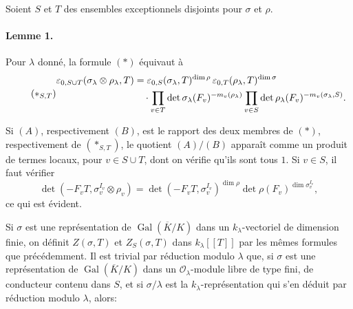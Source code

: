 \documentclass[11pt]{article}
\newcommand{\Gal}{\operatorname{Gal}}
\newcommand{\dimn}{\operatorname{dim}}
\newcommand{\eps}{\varepsilon}
\newcommand{\cO}{\mathcal O}
\begin{document}
Soient $S$ et $T$ des ensembles exceptionnels disjoints pour $\sigma$ et $\rho$.

\paragraph{Lemme 1.} Pour $\lambda$ donné, la formule $(*)$ équivaut à
\begin{equation}\tag{$*_{S,T}$}
\begin{aligned}
\eps_{0,S\cup T}(\sigma_\lambda\otimes\rho_\lambda,T)
&=\eps_{0,S}(\sigma_\lambda,T)^{\dimn\rho}\,
  \eps_{0,T}(\rho_\lambda,T)^{\dimn\sigma} \\
&\quad\cdot \prod_{v\in T}\det\sigma_\lambda(F_v)^{-m_v(\rho_\lambda)}
 \prod_{v\in S}\det\rho_\lambda(F_v)^{-m_v(\sigma_\lambda,S)} .
\end{aligned}
\end{equation}

Si $(A)$, respectivement $(B)$, est le rapport des deux membres de $(*)$, respectivement de $(*_{S,T})$, le quotient $(A)/(B)$ apparaît comme un produit de termes locaux, pour $v\in S\cup T$, dont on vérifie qu'ils sont tous $1$. Si $v\in S$, il faut vérifier
\[
 \det(-F_vT,\sigma_v^{I_v}\otimes\rho_v)
 =\det(-F_vT,\sigma_v^{I_v})^{\dimn\rho}
   \det\rho(F_v)^{\dimn\sigma_v^{I_v}},
\]
ce qui est évident.

Si $\sigma$ est une représentation de $\Gal(\overline K/K)$ dans un $k_\lambda$-vectoriel de dimension finie, on définit $Z(\sigma,T)$ et $Z_S(\sigma,T)$ dans $k_\lambda[[T]]$ par les mêmes formules que précédemment. Il est trivial par réduction modulo $\lambda$ que, si $\sigma$ est une représentation de $\Gal(\overline K/K)$ dans un $\cO_\lambda$-module libre de type fini, de conducteur contenu dans $S$, et si $\sigma/\lambda$ est la $k_\lambda$-représentation qui s'en déduit par réduction modulo $\lambda$, alors:
\end{document}
